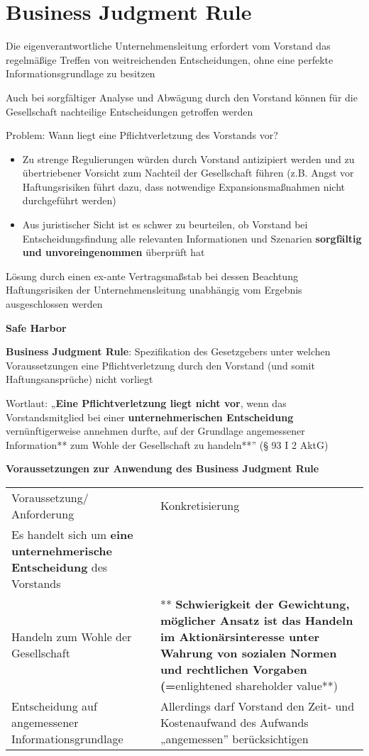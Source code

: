 \documentclass[
]{article}
\providecommand{\tightlist}{%
  \setlength{\itemsep}{0pt}\setlength{\parskip}{0pt}}
\begin{document}
\hypertarget{business-judgment-rule}{%
\section{Business Judgment Rule}\label{business-judgment-rule}}

Die eigenverantwortliche Unternehmensleitung erfordert vom Vorstand das
regelmäßige Treffen von weitreichenden Entscheidungen, ohne eine
perfekte Informationsgrundlage zu besitzen

Auch bei sorgfältiger Analyse und Abwägung durch den Vorstand können für
die Gesellschaft nachteilige Entscheidungen getroffen werden

Problem: Wann liegt eine Pflichtverletzung des Vorstands vor?

\begin{itemize}
\tightlist
\item
  Zu strenge Regulierungen würden durch Vorstand antizipiert werden und
  zu übertriebener Vorsicht zum Nachteil der Gesellschaft führen (z.B.
  Angst vor Haftungsrisiken führt dazu, dass notwendige
  Expansionsmaßnahmen nicht durchgeführt werden)
\item
  Aus juristischer Sicht ist es schwer zu beurteilen, ob Vorstand bei
  Entscheidungsfindung alle relevanten Informationen und Szenarien
  \textbf{sorgfältig und unvoreingenommen} überprüft hat
\end{itemize}

Lösung durch einen ex-ante Vertragsmaßstab bei dessen Beachtung
Haftungsrisiken der Unternehmensleitung unabhängig vom Ergebnis
ausgeschlossen werden

\textbf{Safe Harbor}

\textbf{Business Judgment Rule}: Spezifikation des Gesetzgebers unter
welchen Voraussetzungen eine Pflichtverletzung durch den Vorstand (und
somit Haftungsansprüche) nicht vorliegt

Wortlaut: „\textbf{Eine Pflichtverletzung liegt nicht vor}, wenn das
Vorstandsmitglied bei einer \textbf{unternehmerischen Entscheidung}
vernünftigerweise annehmen durfte, auf der Grundlage angemessener
Information** zum Wohle der Gesellschaft zu handeln**'' (§ 93 I 2 AktG)

\textbf{Voraussetzungen zur Anwendung des Business Judgment Rule}

\begin{longtable}[]{@{}ll@{}}
\toprule
\endhead
Voraussetzung/ Anforderung & Konkretisierung \\
Es handelt sich um \textbf{eine unternehmerische Entscheidung} des
Vorstands & \\
Handeln zum Wohle der Gesellschaft & ** \textbf{Schwierigkeit der
Gewichtung, möglicher Ansatz ist das Handeln im Aktionärsinteresse unter
Wahrung von sozialen Normen und rechtlichen Vorgaben (=}enlightened
shareholder value**) \\
Entscheidung auf angemessener Informationsgrundlage & Allerdings darf
Vorstand den Zeit- und Kostenaufwand des Aufwands „angemessen''
berücksichtigen \\
\bottomrule
\end{longtable}
\end{document}
